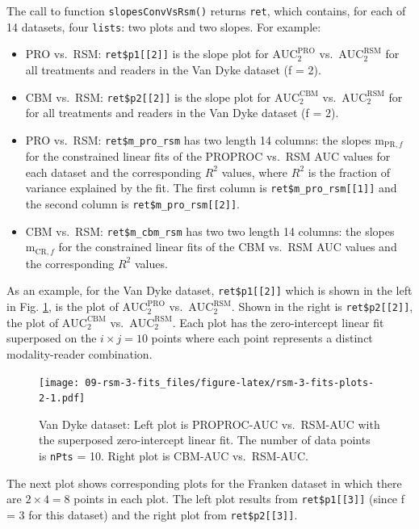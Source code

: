 \documentclass[
]{book}
\begin{document}
The call to function \texttt{slopesConvVsRsm()} returns \texttt{ret}, which contains, for each of 14 datasets, four \texttt{lists}: two plots and two slopes. For example:

\begin{itemize}
\item
  PRO vs.~RSM: \texttt{ret\$p1{[}{[}2{]}{]}} is the slope plot for \(\text{AUC}^{\text{PRO}}_2\) vs.~\(\text{AUC}^\text{RSM}_2\) for all treatments and readers in the Van Dyke dataset (f = 2).
\item
  CBM vs.~RSM: \texttt{ret\$p2{[}{[}2{]}{]}} is the slope plot for \(\text{AUC}^{\text{CBM}}_2\) vs.~\(\text{AUC}^\text{RSM}_2\) for for all treatments and readers in the Van Dyke dataset (f = 2).
\item
  PRO vs.~RSM: \texttt{ret\$m\_pro\_rsm} has two length 14 columns: the slopes \(\text{m}_{\text{PR},f}\) for the constrained linear fits of the PROPROC vs.~RSM AUC values for each dataset and the corresponding \(R^2\) values, where \(R^2\) is the fraction of variance explained by the fit. The first column is \texttt{ret\$m\_pro\_rsm{[}{[}1{]}{]}} and the second column is \texttt{ret\$m\_pro\_rsm{[}{[}2{]}{]}}.
\item
  CBM vs.~RSM: \texttt{ret\$m\_cbm\_rsm} has two two length 14 columns: the slopes \(\text{m}_{\text{CR},f}\) for the constrained linear fits of the CBM vs.~RSM AUC values and the corresponding \(R^2\) values.
\end{itemize}

As an example, for the Van Dyke dataset, \texttt{ret\$p1{[}{[}2{]}{]}} which is shown in the left in Fig. \ref{fig:rsm-3-fits-plots-2}, is the plot of \(\text{AUC}^{\text{PRO}}_2\) vs.~\(\text{AUC}^\text{RSM}_2\). Shown in the right is \texttt{ret\$p2{[}{[}2{]}{]}}, the plot of \(\text{AUC}^{\text{CBM}}_2\) vs.~\(\text{AUC}^\text{RSM}_2\). Each plot has the zero-intercept linear fit superposed on the \(i\times j = 10\) points where each point represents a distinct modality-reader combination.

\begin{figure}
\centering
\texttt{[image: 09-rsm-3-fits\_files/figure-latex/rsm-3-fits-plots-2-1.pdf]}
\caption{\label{fig:rsm-3-fits-plots-2}Van Dyke dataset: Left plot is PROPROC-AUC vs.~RSM-AUC with the superposed zero-intercept linear fit. The number of data points is \texttt{nPts} = 10. Right plot is CBM-AUC vs.~RSM-AUC.}
\end{figure}

The next plot shows corresponding plots for the Franken dataset in which there are \(2\times 4 = 8\) points in each plot. The left plot results from \texttt{ret\$p1{[}{[}3{]}{]}} (since f = 3 for this dataset) and the right plot from \texttt{ret\$p2{[}{[}3{]}{]}}.
\end{document}
